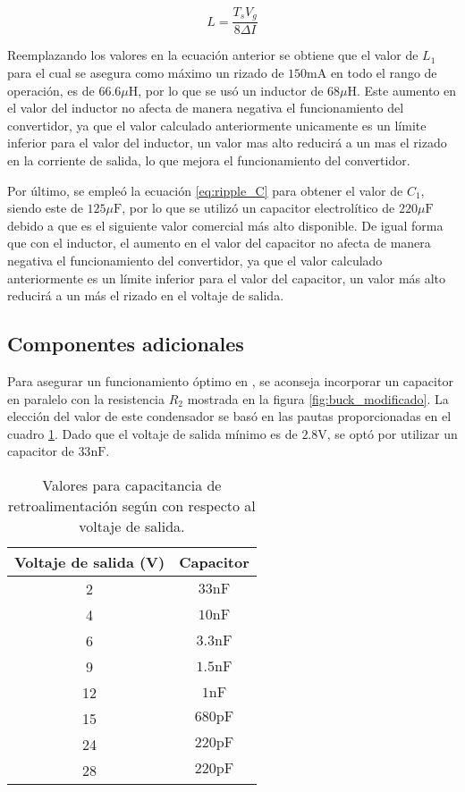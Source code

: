 $$ L =  \frac{T_sV_g}{8\Delta I}$$
 
Reemplazando los valores en la ecuación anterior se obtiene que el valor de 
$L_1$ para el cual se asegura como máximo un rizado de $150 \text{mA}$ en 
todo el rango de operación, es de $66.6 \mu \text{H}$, por lo que se usó un
inductor de $68 \mu \text{H}$. Este aumento en el valor del inductor no afecta
de manera negativa el funcionamiento del convertidor, ya que el valor calculado
anteriormente unicamente es un límite inferior para el valor del inductor, un 
valor mas alto reducirá a un mas el rizado en la corriente de salida, lo que 
mejora el funcionamiento del convertidor.

Por último, se empleó la ecuación \ref{eq:ripple_C} para obtener el valor 
de $C_1$, siendo este de $125 \mu\text{F}$, por lo que se utilizó un capacitor
electrolítico de $220 \mu\text{F}$ debido a que es el siguiente valor comercial 
más alto disponible. De igual forma que con el inductor, el
aumento en el valor del capacitor no afecta de manera negativa el funcionamiento
del convertidor, ya que el valor calculado anteriormente es un límite inferior
para el valor del capacitor, un valor más alto reducirá a un más el rizado en
el voltaje de salida.

\subsection{Componentes adicionales}

Para asegurar un funcionamiento óptimo en \cite{lm2596}, se aconseja incorporar
un capacitor en paralelo con la resistencia $R_2$ mostrada en la figura
\ref{fig:buck_modificado}. La elección del valor de este condensador se basó
en las pautas proporcionadas en el cuadro \ref{tb:feedforward_cap}. 
Dado que el voltaje de salida mínimo es de $2.8\text{V}$, se optó por utilizar
un capacitor de $33\text{nF}$.

\begin{table}[t]
    \centering
    \begin{tabular}{|c|c|}
        \hline
        Voltaje de salida (V) & Capacitor \\
        \hline
        2 & $33\text{nF}$ \\
        4 & $10\text{nF}$ \\
        6 & $3.3\text{nF}$ \\
        9 & $1.5\text{nF}$ \\
        12 & $1\text{nF}$ \\
        15 & $680\text{pF}$ \\
        24 & $220\text{pF}$ \\
        28 & $220\text{pF}$ \\
        \hline
    \end{tabular}
    \caption{Valores para capacitancia de retroalimentación según \cite{lm2596}
        con respecto al voltaje de salida.}
    \label{tb:feedforward_cap}
\end{table}



